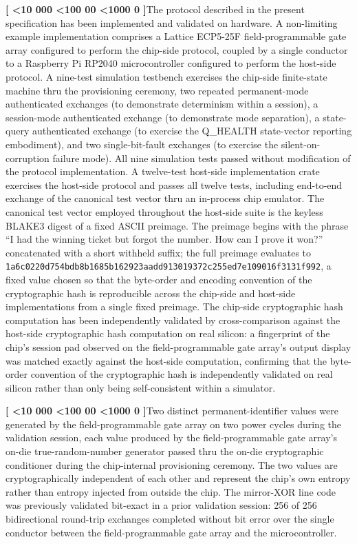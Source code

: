 \documentclass[12pt,letterpaper]{article}
\newcounter{para}
\newcommand{\padzero}{%
  \ifnum\value{para}<10 000\else%
  \ifnum\value{para}<100 00\else%
  \ifnum\value{para}<1000 0\else%
  \fi\fi\fi}
\newcommand{\para}{%
  \refstepcounter{para}\noindent\textbf{[\padzero\arabic{para}]}\hspace{0.5em}\ignorespaces}
\newcounter{fig}
\begin{document}
\para The protocol described in the present specification has been implemented and validated on hardware. A non-limiting example implementation comprises a Lattice ECP5-25F field-programmable gate array configured to perform the chip-side protocol, coupled by a single conductor to a Raspberry Pi RP2040 microcontroller configured to perform the host-side protocol. A nine-test simulation testbench exercises the chip-side finite-state machine thru the provisioning ceremony, two repeated permanent-mode authenticated exchanges (to demonstrate determinism within a session), a session-mode authenticated exchange (to demonstrate mode separation), a state-query authenticated exchange (to exercise the Q\_HEALTH state-vector reporting embodiment), and two single-bit-fault exchanges (to exercise the silent-on-corruption failure mode). All nine simulation tests passed without modification of the protocol implementation. A twelve-test host-side implementation crate exercises the host-side protocol and passes all twelve tests, including end-to-end exchange of the canonical test vector thru an in-process chip emulator.
The canonical test vector employed throughout the host-side suite is the keyless BLAKE3 digest of a fixed ASCII preimage. The preimage begins with the phrase ``I had the winning ticket but forgot the number. How can I prove it won?'' concatenated with a short withheld suffix; the full preimage evaluates to \texttt{1a6c0220d754bdb8b1685b162923aadd913019372c255ed7e109016f3131f992}, a fixed value chosen so that the byte-order and encoding convention of the cryptographic hash is reproducible across the chip-side and host-side implementations from a single fixed preimage. The chip-side cryptographic hash computation has been independently validated by cross-comparison against the host-side cryptographic hash computation on real silicon: a fingerprint of the chip's session pad observed on the field-programmable gate array's output display was matched exactly against the host-side computation, confirming that the byte-order convention of the cryptographic hash is independently validated on real silicon rather than only being self-consistent within a simulator.

\para Two distinct permanent-identifier values were generated by the field-programmable gate array on two power cycles during the validation session, each value produced by the field-programmable gate array's on-die true-random-number generator passed thru the on-die cryptographic conditioner during the chip-internal provisioning ceremony. The two values are cryptographically independent of each other and represent the chip's own entropy rather than entropy injected from outside the chip. The mirror-XOR line code was previously validated bit-exact in a prior validation session: 256 of 256 bidirectional round-trip exchanges completed without bit error over the single conductor between the field-programmable gate array and the microcontroller.
\end{document}

